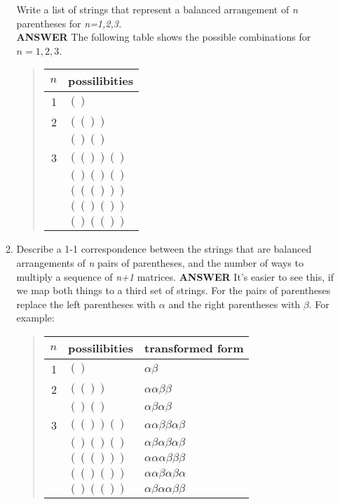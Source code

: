 \documentclass{article}
\begin{document}
\begin{enumerate}
\begin{enumerate}
Write a list of strings that represent a balanced arrangement
of \textit{n} parentheses for \textit{n=1,2,3.}\\
\vskip 10pt  \textbf{ANSWER}
 The following table shows the
possible combinations for $n= 1,2,3$.
\begin{quote}
\begin{tabular}{r|l}
$n$ & possilibities\\
\hline
1  &   $( )$ \\
\hline
2   &   $( ( ) )$   \\
    &   $( ) ( )$   \\
\hline
3   &   $( ( ) ) ( )$ \\
    &   $( ) ( ) ( )$ \\
    &   $( ( ( ) ) )$ \\
    &   $( ( ) ( ) )$ \\
    &   $( ) ( ( ) )$ \\
\end{tabular}
\end{quote}

\item
 Describe a 1-1 correspondence between the strings that are
balanced arrangements of \textit{n} pairs of parentheses, and the
number of ways to multiply a sequence of \textit{n+1} matrices.
\vskip 10pt  \textbf{ANSWER} It's easier to see this, if we map
both things to a third set of strings. For the pairs of
parentheses replace the left parentheses with $\alpha$ and the
right parentheses with $\beta$. For example:
\begin{quote}
\begin{tabular}{r|l| l}
$n$ & possilibities & transformed form\\
\hline
1  &   $( )$ & $\alpha \beta$ \\
\hline
2   &   $( ( ) )$  & $\alpha \alpha \beta \beta$ \\
    &   $( ) ( )$  & $\alpha \beta \alpha \beta$ \\
\hline
3   &   $( ( ) ) ( )$ & $\alpha \alpha \beta \beta \alpha \beta$ \\
    &   $( ) ( ) ( )$ & $\alpha \beta \alpha \beta \alpha \beta$ \\
    &   $( ( ( ) ) )$ & $\alpha \alpha \alpha \beta \beta \beta$ \\
    &   $( ( ) ( ) )$ & $\alpha \alpha \beta \alpha \beta \alpha$ \\
    &   $( ) ( ( ) )$ & $\alpha \beta \alpha \alpha \beta \beta$ \\
\end{tabular}
\end{quote}


\end{enumerate}
\end{enumerate}
\end{document}
